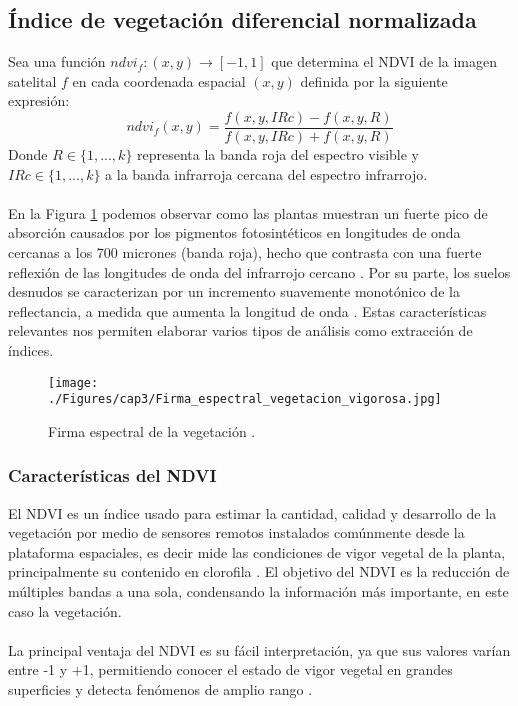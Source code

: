 \subsection{\'Indice de vegetaci\'on diferencial normalizada}\label{subsec:ndvi}
Sea una funci\'on $ ndvi_{f}:(x,y) \longrightarrow [-1,1] $ que determina el NDVI de la imagen satelital $ f $ en cada coordenada espacial $ (x,y) $ definida por la siguiente expresi\'on:
\begin{equation}
\label{e:ndvi}
ndvi_{f}(x,y)=\dfrac{f(x,y,IRc)-f(x,y,R)}{f(x,y,IRc)+f(x,y,R)}
\end{equation}
Donde $ R \in \{1,...,k\}$ representa la banda roja del espectro visible y  $ IRc \in \{1,...,k\}$ a la banda infrarroja cercana del espectro infrarrojo.\\~\\
En la Figura \ref{fig:firmaVegetacion} podemos observar como las plantas muestran un fuerte pico de absorci\'on causados por los pigmentos fotosint\'eticos en longitudes de onda cercanas a los 700 micrones (banda roja), hecho que contrasta con una fuerte reflexi\'on de las longitudes de onda del infrarrojo cercano \cite{salinero2002teledeteccion}. Por su parte, los suelos desnudos se caracterizan por un incremento suavemente monot\'onico de la reflectancia, a medida que aumenta la longitud de onda \cite{salinero2002teledeteccion}. Estas caracter\'isticas relevantes nos permiten elaborar varios tipos de an\'alisis como extracci\'on de \'indices.
\begin{figure}[H]
	\centering
	\texttt{[image: ./Figures/cap3/Firma\_espectral\_vegetacion\_vigorosa.jpg]}
	\caption{Firma espectral de la vegetaci\'on \cite{ndvi2015com}.}
	\label{fig:firmaVegetacion}
\end{figure}

\subsubsection{Caracter\'isticas del NDVI}\label{subsec:subndvi}
El NDVI es un \'indice usado para estimar la cantidad, calidad y desarrollo de la vegetaci\'on por medio de sensores remotos instalados com\'unmente desde la plataforma espaciales, es decir mide las condiciones de vigor vegetal de la planta, principalmente su contenido en clorofila \cite{salinero2002teledeteccion}. El objetivo del NDVI es la reducci\'on de m\'ultiples bandas a una sola, condensando la informaci\'on m\'as importante, en este caso la vegetaci\'on.\\~\\
La principal ventaja del NDVI es su f\'acil interpretaci\'on, ya que sus valores var\'ian entre -1 y +1, permitiendo conocer el estado de vigor vegetal en grandes superficies y detecta fen\'omenos de amplio rango \cite{salinero2002teledeteccion}.

